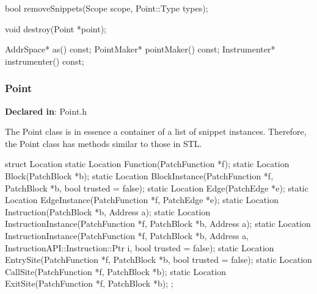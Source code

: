\begin{apient}
bool removeSnippets(Scope scope, Point::Type types);
\end{apient}


\begin{apient}
void destroy(Point *point);
\end{apient}


\begin{apient}
AddrSpace* as() const;
PointMaker* pointMaker() const;
Instrumenter* instrumenter() const;
\end{apient}


\subsubsection{Point}
\label{sec-3.1.2}

\textbf{Declared in}: Point.h

The Point class is in essence a container of a list of snippet
instances. Therefore, the Point class has methods similar to those in STL.

\begin{apient}
struct Location {
   static Location Function(PatchFunction *f);
   static Location Block(PatchBlock *b);
   static Location BlockInstance(PatchFunction *f, PatchBlock *b, bool trusted = false);
   static Location Edge(PatchEdge *e);
   static Location EdgeInstance(PatchFunction *f, PatchEdge *e);
   static Location Instruction(PatchBlock *b, Address a);
   static Location InstructionInstance(PatchFunction *f, PatchBlock *b, Address a);
   static Location InstructionInstance(PatchFunction *f, PatchBlock *b, Address a,
                                       InstructionAPI::Instruction::Ptr i,
                                       bool trusted = false);
   static Location EntrySite(PatchFunction *f, PatchBlock *b, bool trusted = false);
   static Location CallSite(PatchFunction *f, PatchBlock *b);
   static Location ExitSite(PatchFunction *f, PatchBlock *b);
};
\end{apient}

